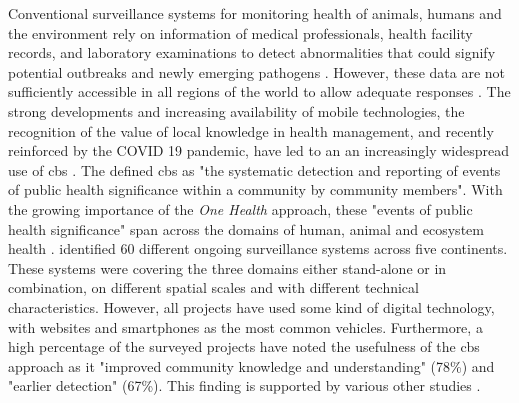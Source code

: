 Conventional surveillance systems for monitoring health of animals, humans and the environment rely on information of medical professionals, health facility records, and laboratory examinations to detect abnormalities that could signify potential outbreaks and newly emerging pathogens \autocite{mcneilLandscapeParticipatorySurveillance2022a}. However, these data are not sufficiently accessible in all regions of the world to allow adequate responses \autocite{mcneilLandscapeParticipatorySurveillance2022a,nikolayEvaluatingHospitalBasedSurveillance2017}. The strong developments and increasing availability of mobile technologies, the recognition of the value of local knowledge in health management, and recently reinforced by the COVID 19 pandemic, have led to an an increasingly widespread use of \acrshort{cbs} \autocite{kullenbergWhatCitizenScience2016,mcneilLandscapeParticipatorySurveillance2022a}. The \autocite{technicalcontributorstothejune2018whomeetingDefinitionCommunitybasedSurveillance2019} defined \acrshort{cbs} as "the systematic detection and reporting of events of public health significance within a community by community members". With the growing importance of the \textit{One Health} approach, these "events of public health significance" span across the domains of human, animal and ecosystem health \autocite{cdcOneHealthBasics2022}.\newline
\autocite{mcneilLandscapeParticipatorySurveillance2022a} identified 60 different ongoing surveillance systems across five continents. These systems were covering the three domains either stand-alone or in combination, on different spatial scales and with different technical characteristics. However, all projects have used some kind of digital technology, with websites and smartphones as the most common vehicles. Furthermore, a high percentage of the surveyed projects have noted the usefulness of the \acrshort{cbs} approach as it "improved community knowledge and understanding" (78\%) and "earlier detection" (67\%). This finding is supported by various other studies \autocite{byrneCommunitycentredApproachGlobal2020,jarrettEvaluationPopulationMobility2020,mcgowanCommunitybasedSurveillanceInfectious2022,metugeHumanitarianLedCommunitybased2021,ratnayakeEarlyDetectionCholera2020,ratnayakePeoplecentredSurveillanceNarrative2020,technicalcontributorstothejune2018whomeetingDefinitionCommunitybasedSurveillance2019}.\newline
